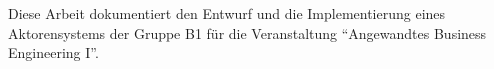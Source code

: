 Diese Arbeit dokumentiert den Entwurf und die Implementierung eines Aktorensystems der Gruppe B1 für die Veranstaltung \enquote{Angewandtes Business Engineering I}.
